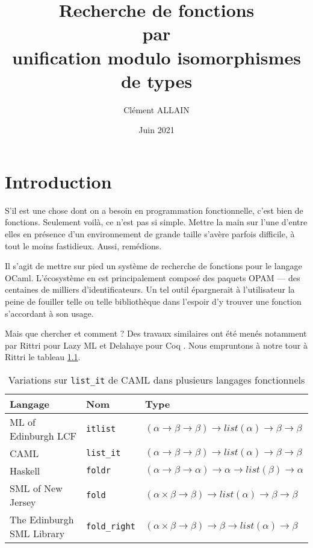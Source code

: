\documentclass [a4paper] {report}
\title {Recherche de fonctions \\ par \\ unification modulo isomorphismes de types}
\author {Clément ALLAIN}
\date {Juin 2021}
\theoremstyle {definition}
\begin{document}
\maketitle

\tableofcontents

\newpage


\chapter {Introduction}

S'il est une chose dont on a besoin en programmation fonctionnelle, c'est bien de fonctions. Seulement voilà, ce n'est pas si simple. Mettre la main sur l'une d'entre elles en présence d'un environnement de grande taille s'avère parfois difficile, à tout le moins fastidieux. Aussi, remédions.

Il s'agit de mettre sur pied un système de recherche de fonctions pour le langage OCaml. L'écosystème en est principalement composé des paquets OPAM --- des centaines de milliers d'identificateurs. Un tel outil épargnerait à l'utilisateur la peine de fouiller telle ou telle bibliothèque dans l'espoir d'y trouver une fonction s'accordant à son usage.

Mais que chercher et comment ? Des travaux similaires ont été menés notamment par Rittri pour Lazy ML \cite {rittri91, rittri93} et Delahaye pour Coq \cite {delahaye}. Nous empruntons à notre tour à Rittri \cite {rittri91} le tableau \ref {tab_fold}.

\begin {table} [h]
	\centering
	\begin {tabular} {|l|l|l|}
		\hline
			Langage &
			Nom &
			Type
		\\
		\hline
			ML of Edinburgh LCF &
			\texttt {itlist} &
			$(\alpha \rightarrow \beta \rightarrow \beta) \rightarrow list (\alpha) \rightarrow \beta \rightarrow \beta$
		\\
			CAML &
			\texttt {list\_it} &
			$(\alpha \rightarrow \beta \rightarrow \beta) \rightarrow list (\alpha) \rightarrow \beta \rightarrow \beta$
		\\
			Haskell &
			\texttt {foldr} &
			$(\alpha \rightarrow \beta \rightarrow \alpha) \rightarrow \alpha \rightarrow list (\beta) \rightarrow \alpha$
		\\
			SML of New Jersey &
			\texttt {fold} &
			$(\alpha \times \beta \rightarrow \beta) \rightarrow list (\alpha) \rightarrow \beta \rightarrow \beta$
		\\
			The Edinburgh SML Library &
			\texttt {fold\_right} &
			$(\alpha \times \beta \rightarrow \beta) \rightarrow \beta \rightarrow list (\alpha) \rightarrow \beta$ \\
		\hline
	\end {tabular}
	\caption {\label {tab_fold} Variations sur \texttt {list\_it} de CAML dans plusieurs langages fonctionnels}
\end {table}
\end{document}
